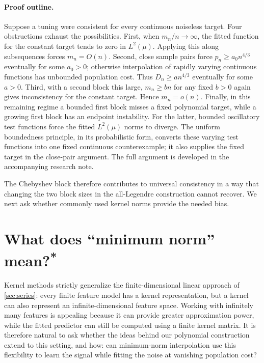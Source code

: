 \documentclass[11pt,twoside]{article}
\newcommand{\suppmark}{\texorpdfstring{\textsuperscript{*}}{*}}
\theoremstyle{definition}
\theoremstyle{remark}
\begin{document}
\paragraph{Proof outline.}
Suppose a tuning were consistent for every continuous noiseless target.
Four obstructions exhaust the possibilities. First, when $m_n/n\to\infty$,
the fitted function for the constant target tends to zero in $L^2(\mu)$.
Applying this along subsequences forces $m_n=O(n)$. Second, close sample
pairs force $p_n\ge a_0n^{4/3}$ eventually for some $a_0>0$; otherwise
interpolation of rapidly varying continuous functions has unbounded
population cost. Thus $D_n\ge a n^{4/3}$ eventually for some $a>0$.
Third, with a second block this large, $m_n\ge bn$ for any fixed $b>0$
again gives inconsistency for the constant target. Hence $m_n=o(n)$.
Finally, in this remaining regime a bounded first block misses a fixed
polynomial target, while a growing first block has an endpoint instability.
For the latter, bounded oscillatory test functions force the fitted
$L^2(\mu)$ norms to diverge. The uniform boundedness principle, in its
probabilistic form, converts these varying test functions into one fixed
continuous counterexample; it also supplies the fixed target in the
close-pair argument. The full argument is developed in the accompanying
research note.

The Chebyshev block therefore contributes to universal consistency in a way
that changing the two block sizes in the all-Legendre construction cannot
recover. We next ask whether commonly used kernel norms provide the needed
bias.

\section{What does ``minimum norm'' mean?\suppmark}
\label{sec:minnorm}

Kernel methods strictly generalize the finite-dimensional linear approach of
\cref{sec:series}: every finite feature model has a kernel representation,
but a kernel can also represent an infinite-dimensional feature space.
Working with infinitely many features is appealing because it can provide
greater approximation power, while the fitted predictor can still be
computed using a finite kernel matrix. It is therefore natural to ask
whether the ideas behind our polynomial construction extend to this
setting, and how: can minimum-norm interpolation use this flexibility to
learn the signal while fitting the noise at vanishing population cost?
\end{document}
